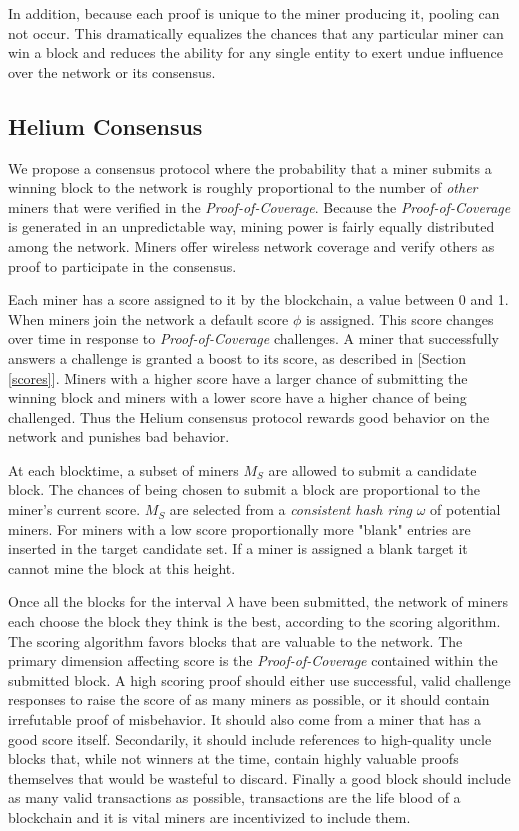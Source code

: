 \documentclass[10pt, nonatbib, nocopyrightspace, reprint]{sigplanconf}
\begin{document}
In addition, because each proof is unique to the miner producing it, pooling can not occur. This dramatically equalizes the chances that any particular miner can win a block and reduces the ability for any single entity to exert undue influence over the network or its consensus.

\subsection{Helium Consensus}

We propose a consensus protocol where the probability that a miner submits a winning block to the network is roughly proportional to the number of \emph{other} miners that were verified in the \emph{Proof-of-Coverage}. Because the \emph{Proof-of-Coverage} is generated in an unpredictable way, mining power is fairly equally distributed among the network. Miners offer wireless network coverage and verify others as proof to participate in the consensus.

Each miner has a score assigned to it by the blockchain, a value between 0 and 1. When miners join the network a default score $\phi$ is assigned. This score changes over time in response to \emph{Proof-of-Coverage} challenges. A miner that successfully answers a challenge is granted a boost to its score, as described in [Section \ref{scores}]. Miners with a higher score have a larger chance of submitting the winning block and miners with a lower score have a higher chance of being challenged. Thus the Helium consensus protocol rewards good behavior on the network and punishes bad behavior.

At each blocktime, a subset of miners $M_S$ are allowed to submit a candidate block. The chances of being chosen to submit a block are proportional to the miner's current score. $M_S$ are selected from a \emph{consistent hash ring} $\omega$ of potential miners. For miners with a low score proportionally more "blank" entries are inserted in the target candidate set. If a miner is assigned a blank target it cannot mine the block at this height. 

Once all the blocks for the interval $\lambda$ have been submitted, the network of miners each choose the block they think is the best, according to the scoring algorithm. The scoring algorithm favors blocks that are valuable to the network. The primary dimension affecting score is the \emph{Proof-of-Coverage} contained within the submitted block. A high scoring proof should either use successful, valid challenge responses to raise the score of as many miners as possible, or it should contain irrefutable proof of misbehavior. It should also come from a miner that has a good score itself. Secondarily, it should include references to high-quality uncle blocks that, while not winners at the time, contain highly valuable proofs themselves that would be wasteful to discard. Finally a good block should include as many valid transactions as possible, transactions are the life blood of a blockchain and it is vital miners are incentivized to include them.
\end{document}
